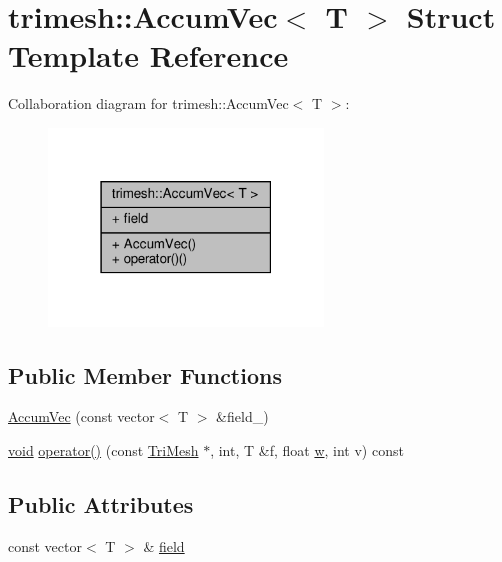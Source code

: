 \hypertarget{structtrimesh_1_1AccumVec}{}\section{trimesh\+:\+:Accum\+Vec$<$ T $>$ Struct Template Reference}
\label{structtrimesh_1_1AccumVec}


Collaboration diagram for trimesh\+:\+:Accum\+Vec$<$ T $>$\+:\nopagebreak
\begin{figure}[H]
\begin{center}
\leavevmode
\includegraphics[width=207pt]{df/d9f/structtrimesh_1_1AccumVec__coll__graph}
\end{center}
\end{figure}
\subsection*{Public Member Functions}
\begin{DoxyCompactItemize}
\item 
\hyperlink{structtrimesh_1_1AccumVec_a1f2a837cd65c6efc4bc003d429ae8f43}{Accum\+Vec} (const vector$<$ T $>$ \&field\+\_\+)
\item 
\hyperlink{namespacetrimesh_a784ddfd979e1c579bda795a8edfc3f43}{void} \hyperlink{structtrimesh_1_1AccumVec_a65a3ac9c7b655346db533ee274940637}{operator()} (const \hyperlink{classtrimesh_1_1TriMesh}{Tri\+Mesh} $\ast$, int, T \&f, float \hyperlink{namespacetrimesh_acd577db8a2f95fe39ececb95e98a6c71}{w}, int v) const
\end{DoxyCompactItemize}
\subsection*{Public Attributes}
\begin{DoxyCompactItemize}
\item 
const vector$<$ T $>$ \& \hyperlink{structtrimesh_1_1AccumVec_aefbc404dfe8f74fc5f16f6fcaa85cbc4}{field}
\end{DoxyCompactItemize}


